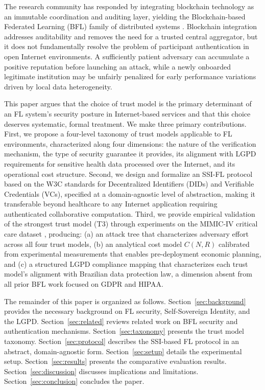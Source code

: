 \documentclass{sbc2023}
\begin{document}
The research community has responded by integrating blockchain technology as an immutable coordination and auditing layer, yielding the Blockchain-based Federated Learning (BFL) family of distributed systems \citep{ning2024blockchain, weng2021deepchain}. Blockchain integration addresses auditability and removes the need for a trusted central aggregator, but it does not fundamentally resolve the problem of participant authentication in open Internet environments. A sufficiently patient adversary can accumulate a positive reputation before launching an attack, while a newly onboarded legitimate institution may be unfairly penalized for early performance variations driven by local data heterogeneity.

This paper argues that the choice of trust model is the primary determinant of an FL system's security posture in Internet-based services and that this choice deserves systematic, formal treatment. We make three primary contributions. First, we propose a four-level taxonomy of trust models applicable to FL environments, characterized along four dimensions: the nature of the verification mechanism, the type of security guarantee it provides, its alignment with LGPD requirements for sensitive health data processed over the Internet, and its operational cost structure. Second, we design and formalize an SSI-FL protocol based on the W3C standards for Decentralized Identifiers (DIDs) and Verifiable Credentials (VCs), specified at a domain-agnostic level of abstraction, making it transferable beyond healthcare to any Internet application requiring authenticated collaborative computation. Third, we provide empirical validation of the strongest trust model (T3) through experiments on the MIMIC-IV critical care dataset \citep{johnson2020mimic}, producing: (a) an attack tree that characterizes adversary effort across all four trust models, (b) an analytical cost model $C(N,R)$ calibrated from experimental measurements that enables pre-deployment economic planning, and (c) a structured LGPD compliance mapping that characterizes each trust model's alignment with Brazilian data protection law, a dimension absent from all prior BFL work focused on GDPR and HIPAA.

The remainder of this paper is organized as follows. Section~\ref{sec:background} provides the necessary background on FL security, Self-Sovereign Identity, and the LGPD. Section~\ref{sec:related} reviews related work on BFL security and authentication mechanisms. Section~\ref{sec:taxonomy} presents the trust model taxonomy. Section~\ref{sec:protocol} describes the SSI-based FL protocol in an abstract, domain-agnostic form. Section~\ref{sec:setup} details the experimental setup. Section~\ref{sec:results} presents the comparative evaluation results. Section~\ref{sec:discussion} discusses implications and limitations. Section~\ref{sec:conclusion} concludes the paper.
\end{document}
